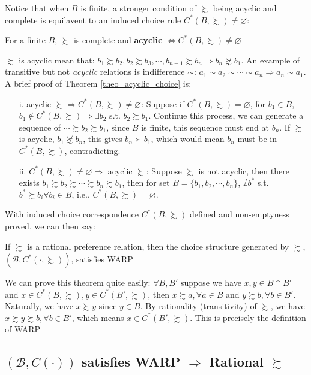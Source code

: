 Notice that when $B$ is finite, a stronger condition of $\succsim$ being acyclic and complete is equilavent to an induced choice rule $C^*(B,\succsim)\neq \varnothing$: 
\begin{theorem}\label{theo_acyclic_choice}
    For a finite $B$, $\succsim$ is complete and \textbf{acyclic} $\Leftrightarrow C^*(B,\succsim)\neq \varnothing$
\end{theorem}
$\succsim$ is acyclic mean that: $b_1\succsim b_2,b_2\succsim b_3,\cdots, b_{n-1}\succsim b_n\Rightarrow b_n\not\succsim b_1$. An example of transitive but not \textit{acyclic} relations is indifference $\sim$: $a_1\sim a_2\sim \cdots\sim a_n\Rightarrow a_n\sim a_1$.
A brief proof of Theorem \ref{theo_acyclic_choice} is:
\begin{enumerate}
    \item[i.] acyclic $\succsim\Rightarrow C^*(B,\succsim)\neq\varnothing$: Suppose if $C^*(B,\succsim)=\varnothing$, for $b_1\in B$, $b_1\notin C^*(B,\succsim)\Rightarrow \exists b_2$ s.t. $b_2\succsim b_1$. Continue this process, we can generate a sequence of $\cdots\succsim b_2\succsim b_1$, since $B$ is finite, this sequence must end at $b_n$. If $\succsim$ is acyclic, $b_1\not\succsim b_n$, this gives $b_n\succ b_1$, which would mean $b_n$ must be in $C^*(B,\succsim)$, contradicting.
    \item[ii.] $C^*(B,\succsim)\neq\varnothing\Rightarrow$ acyclic $\succsim$: Suppose $\succsim$ is not acyclic, then there exists $b_1\succsim b_2\succsim \cdots\succsim b_n\succsim b_1$, then for set $B=\{b_1,b_2,\cdots,b_n\}$, $\nexists b^*$ s.t. $b^*\succsim b_i \forall b_i\in B$, i.e., $C^*(B,\succsim)=\varnothing$.
\end{enumerate}

With induced choice correspondence $C^*(B,\succsim)$ defined and non-emptyness proved, we can then say:
\begin{theorem}
    If $\succsim$ is a rational preference relation, then the choice structure generated by $\succsim$, $(\mathcal{B},C^*(\cdot,\succsim))$, satisfies WARP
\end{theorem}

We can prove this theorem quite easily: $\forall B,B'$ suppose we have $x,y\in B\cap B'$ and $x\in C^*(B,\succsim),y\in C^*(B',\succsim)$, then $x\succsim a, \forall a\in B$ and $y\succsim b,\forall b\in B'$. Naturally, we have $x\succsim y$ since $y\in B$. By rationality (transitivity) of $\succsim$, we have $x\succsim y\succsim b,\forall b\in B'$, which means $x\in C^*(B',\succsim)$. This is precisely the definition of WARP

\subsection*{$(\mathcal{B},C(\cdot))$ satisfies WARP $\Rightarrow$ Rational $\succsim$}